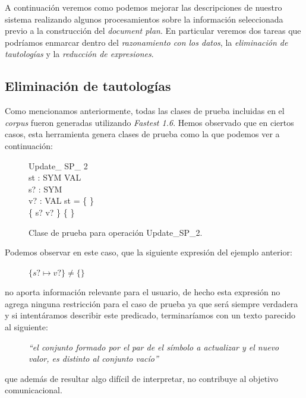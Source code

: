 A continuación veremos como podemos mejorar las descripciones de nuestro sistema realizando algunos procesamientos sobre la información seleccionada previo a la construcción del \textit{document plan}. En particular veremos dos tareas que podríamos enmarcar dentro del \emph{razonamiento con los datos}, la \emph{eliminación de tautologías} y la \emph{reducción de expresiones}. 

\subsection*{Eliminación de tautologías}
Como mencionamos anteriormente, todas las clases de prueba incluidas en el \emph{corpus} fueron generadas utilizando \emph{Fastest 1.6}. Hemos observado que en ciertos casos, esta herramienta genera clases de prueba como la que podemos ver a continuación:

\begin{figure}[H]
  \centering
\begin{schema}{Update\_ SP\_ 2}\\
 st : SYM \pfun VAL \\
 s? : SYM \\
 v? : VAL 
\where
 st = \{ \} \\
 \{ s? \mapsto v? \} \neq \{ \}
\end{schema}
  \caption{Clase de prueba para operación Update\_SP\_2.}
  \label{fig:ej_update_sp_2}
\end{figure}

Podemos observar en este caso, que la siguiente expresión del ejemplo anterior:

\begin{figure}[H]
  \centering
  $\{ s? \mapsto v? \} \neq \{ \}$ 
\end{figure}

\noindent
no aporta información relevante para el usuario, de hecho esta expresión no agrega ninguna restricción para el caso de prueba ya que será siempre verdadera y si intentáramos describir este predicado, terminaríamos con un texto parecido al siguiente:

\begin{figure}[H]
  \centering
  \emph{``el conjunto formado por el par de el símbolo a actualizar y el nuevo valor, es distinto al conjunto vacío''}
\end{figure}

\noindent
que además de resultar algo difícil de interpretar, no contribuye al objetivo comunicacional.

